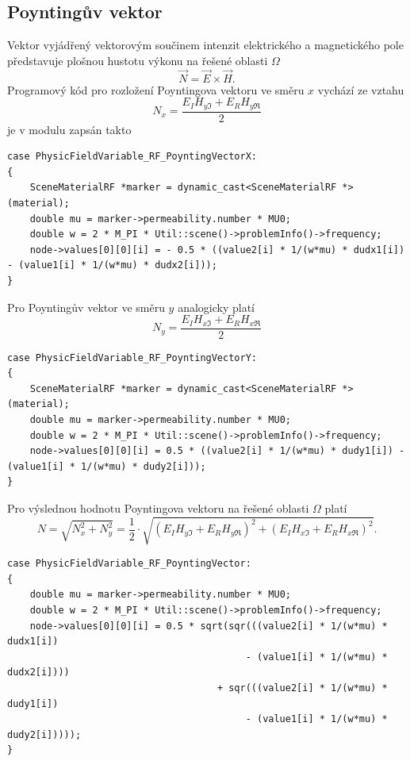 \subsection*{Poyntingův vektor}
Vektor vyjádřený vektorovým součinem intenzit elektrického a magnetického pole představuje plošnou hustotu výkonu na řešené oblasti $\Omega$
\begin{displaymath}
	\vec N = \vec E \times\vec H.
\end{displaymath}
Programový kód pro rozložení Poyntingova vektoru ve směru $x$ vychází ze vztahu
\begin{displaymath}
	N_x = \frac{E_I H_{y\Im} + E_R H_{y\Re}}{2}
\end{displaymath}
je v modulu zapsán takto
\begin{verbatim}
case PhysicFieldVariable_RF_PoyntingVectorX:
{
    SceneMaterialRF *marker = dynamic_cast<SceneMaterialRF *>(material);
    double mu = marker->permeability.number * MU0;
    double w = 2 * M_PI * Util::scene()->problemInfo()->frequency;
    node->values[0][0][i] = - 0.5 * ((value2[i] * 1/(w*mu) * dudx1[i]) - (value1[i] * 1/(w*mu) * dudx2[i]));
}
\end{verbatim}
Pro Poyntingův vektor ve směru $y$ analogicky platí
\begin{displaymath}
	N_y = \frac{E_I H_{x\Im} + E_R H_{x\Re}}{2}
\end{displaymath}
\begin{verbatim}
case PhysicFieldVariable_RF_PoyntingVectorY:
{
    SceneMaterialRF *marker = dynamic_cast<SceneMaterialRF *>(material);
    double mu = marker->permeability.number * MU0;
    double w = 2 * M_PI * Util::scene()->problemInfo()->frequency;
    node->values[0][0][i] = 0.5 * ((value2[i] * 1/(w*mu) * dudy1[i]) - (value1[i] * 1/(w*mu) * dudy2[i]));
}
\end{verbatim}
Pro výslednou hodnotu Poyntingova vektoru na řešené oblasti $\Omega$ platí
\begin{displaymath}
	N = \sqrt{N_{x}^{2} + N_{y}^{2}} = \frac{1}{2}\cdot\sqrt{(E_I H_{y\Im} + E_R H_{y\Re})^{2} + (E_I H_{x\Im} + E_R H_{x\Re})^{2}}.
\end{displaymath}
\begin{verbatim}
case PhysicFieldVariable_RF_PoyntingVector:
{
    double mu = marker->permeability.number * MU0;
    double w = 2 * M_PI * Util::scene()->problemInfo()->frequency;
    node->values[0][0][i] = 0.5 * sqrt(sqr(((value2[i] * 1/(w*mu) * dudx1[i]) 
                                          - (value1[i] * 1/(w*mu) * dudx2[i]))) 
                                     + sqr(((value2[i] * 1/(w*mu) * dudy1[i]) 
                                          - (value1[i] * 1/(w*mu) * dudy2[i]))));
}
\end{verbatim}

